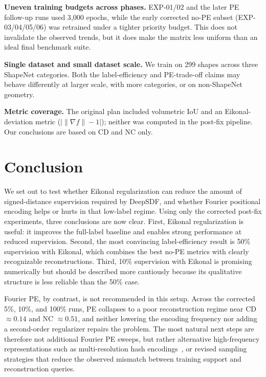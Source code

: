 \documentclass[conference]{IEEEtran}
\begin{document}
\textbf{Uneven training budgets across phases.} EXP-01/02 and the later PE
follow-up runs used 3{,}000 epochs, while the early corrected no-PE subset
(EXP-03/04/05/06) was retrained under a tighter priority budget. This does not
invalidate the observed trends, but it does make the matrix less uniform than an
ideal final benchmark suite.

\textbf{Single dataset and small dataset scale.} We train on 299 shapes across three ShapeNet categories. Both the label-efficiency and PE-trade-off claims may behave differently at larger scale, with more categories, or on non-ShapeNet geometry.

\textbf{Metric coverage.} The original plan included volumetric IoU and an Eikonal-deviation metric ($|\|\nabla f\| - 1|$); neither was computed in the post-fix pipeline. Our conclusions are based on CD and NC only.

\section{Conclusion}

We set out to test whether Eikonal regularization can reduce the amount of
signed-distance supervision required by DeepSDF, and whether Fourier positional
encoding helps or hurts in that low-label regime. Using only the corrected
post-fix experiments, three conclusions are now clear. First, Eikonal
regularization is useful: it improves the full-label baseline and enables strong
performance at reduced supervision. Second, the most convincing label-efficiency
result is 50\% supervision with Eikonal, which combines the best no-PE metrics
with clearly recognizable reconstructions. Third, 10\% supervision with Eikonal
is promising numerically but should be described more cautiously because its
qualitative structure is less reliable than the 50\% case.

Fourier PE, by contrast, is not recommended in this setup. Across the corrected
5\%, 10\%, and 100\% runs, PE collapses to a poor reconstruction regime near
CD $\approx 0.14$ and NC $\approx 0.51$, and neither lowering the encoding
frequency nor adding a second-order regularizer repairs the problem. The most
natural next steps are therefore not additional Fourier PE sweeps, but rather
alternative high-frequency representations such as multi-resolution hash
encodings~\cite{instantngp}, or revised sampling strategies that reduce the
observed mismatch between training support and reconstruction queries.
\end{document}
